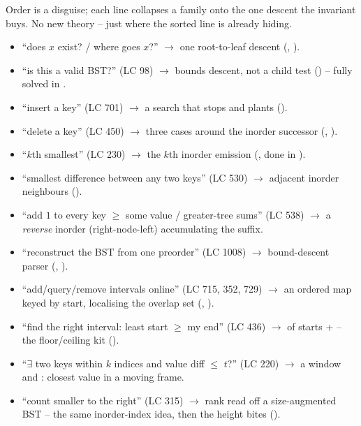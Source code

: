 
Order is a disguise; each line collapses a family onto the one descent the invariant buys. No new
theory -- just where the sorted line is already hiding.

\begin{itemize}[nosep, leftmargin=1.4em]
  \item ``does $x$ exist? / where goes $x$?'' $\longrightarrow$ one root-to-leaf descent
        (, ).
  \item ``is this a valid BST?'' (LC 98) $\longrightarrow$ bounds descent, not a child test
        () -- fully solved in .
  \item ``insert a key'' (LC 701) $\longrightarrow$ a search that stops and plants ().
  \item ``delete a key'' (LC 450) $\longrightarrow$ three cases around the inorder successor
        (, ).
  \item ``$k$th smallest'' (LC 230) $\longrightarrow$ the $k$th inorder emission
        (, done in ).
  \item ``smallest difference between any two keys'' (LC 530) $\longrightarrow$ adjacent inorder
        neighbours ().
  \item ``add $1$ to every key $\ge$ some value / greater-tree sums'' (LC 538) $\longrightarrow$ a
        \emph{reverse} inorder (right-node-left) accumulating the suffix.
  \item ``reconstruct the BST from one preorder'' (LC 1008) $\longrightarrow$ bound-descent parser
        (, ).
  \item ``add/query/remove intervals online'' (LC 715, 352, 729) $\longrightarrow$ an ordered map keyed
        by start, localising the overlap set (, ).
  \item ``find the right interval: least start $\ge$ my end'' (LC 436) $\longrightarrow$  of
        starts +  -- the floor/ceiling kit ().
  \item ``$\exists$ two keys within $k$ indices and value diff $\le$ $t$?'' (LC 220) $\longrightarrow$
        a  window and : closest value in a moving frame.
  \item ``count smaller to the right'' (LC 315) $\longrightarrow$ rank read off a size-augmented BST --
        the same inorder-index idea, then the height bites ().
\end{itemize}

